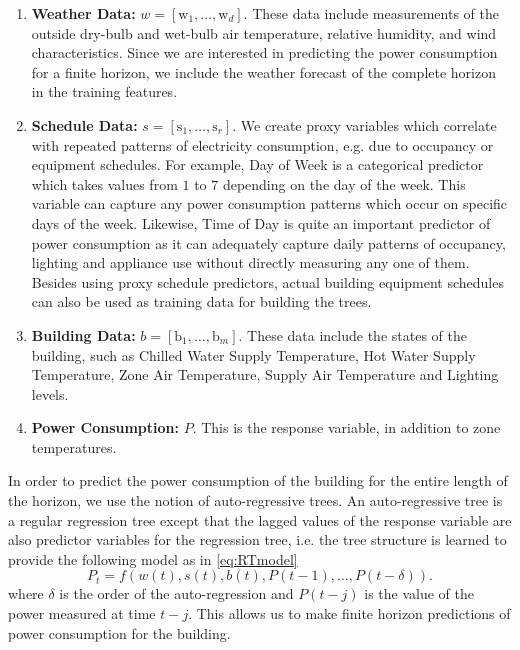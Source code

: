 \textcolor[rgb]{1.00,0.00,0.00}{\begin{enumerate}[leftmargin=1cm]
	\item \textbf{Weather Data:} $w = [\mathrm{w}_1,\ldots,\mathrm{w}_d]$. These data include measurements of the outside dry-bulb and wet-bulb air temperature, relative humidity, and wind characteristics. Since we are interested in predicting the power consumption for a finite horizon, we include the weather forecast of the complete horizon in the training features.
	\item \textbf{Schedule Data:} $s = [\mathrm{s}_1,\ldots,\mathrm{s}_r]$. We create proxy variables which correlate with repeated patterns of electricity consumption, e.g. due to occupancy or equipment schedules. For example, Day of Week is a categorical predictor which takes values from $1$ to $7$ depending on the day of the week. This variable can capture any power consumption patterns which occur on specific days of the week. Likewise, Time of Day is quite an important predictor of power consumption as it can adequately capture daily patterns of occupancy, lighting and appliance use without directly measuring any one of them. Besides using proxy schedule predictors, actual building equipment schedules can also be used as training data for building the trees.
	\item \textbf{Building Data:} $b = [\mathrm{b}_1,\ldots,\mathrm{b}_m]$. These data include the states of the building, such as Chilled Water Supply Temperature, Hot Water Supply Temperature, Zone Air Temperature, Supply Air Temperature and Lighting levels.
	\item \textbf{Power Consumption:} $P$. This is the response variable, in addition to zone temperatures. 
\end{enumerate}
In order to predict the power consumption of the building for the entire length of the horizon, we use the notion of auto-regressive trees. An auto-regressive tree is a regular regression tree except that the lagged values of the response variable are also predictor variables for the regression tree, i.e. the tree structure is learned to provide the following model as in \eqref{eq:RTmodel}
\begin{equation}\label{eq:building_model}
P_t = f \left( w(t), s(t), b(t), P(t-1),\dots, P(t-\delta) \right).
\end{equation}
where $\delta$ is the order of the auto-regression and $P(t-j)$ is the value of the power measured at time $t-j$. This allows us to make finite horizon predictions of power consumption for the building.}

